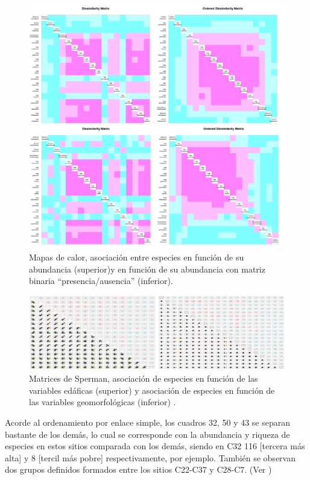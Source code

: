 \documentclass[11pt,]{article}
\begin{document}
\begin{figure}
\centering
\includegraphics[width=1.00000\textwidth]{Analisis/Imagenes manuscrito/Heat_Map_R.png}
\caption{Mapas de calor, asociación entre especies en función de su
abundancia (superior)y en función de su abundancia con matriz binaria
``presencia/ausencia'' (inferior).\label{fig:heat1}}
\end{figure}

\begin{figure}
\centering
\includegraphics[width=1.00000\textwidth]{Analisis/Imagenes manuscrito/Seperman_R.png}
\caption{Matrices de Sperman, asociación de especies en función de las
variables edáficas (superior) y asociación de especies en función de las
variables geomorfológicas (inferior) .\label{fig:sper}}
\end{figure}

Acorde al ordenamiento por enlace simple, los cuadros 32, 50 y 43 se
separan bastante de los demás, lo cual se corresponde con la abundancia
y riqueza de especies en estos sitios comparada con los demás, siendo en
C32 116 {[}tercera más alta{]} y 8 {[}tercil más pobre{]}
respectivamente, por ejemplo. También se observan dos grupos definidos
formados entre los sitios C22-C37 y C28-C7. (Ver \label{fig:denS})
\end{document}
